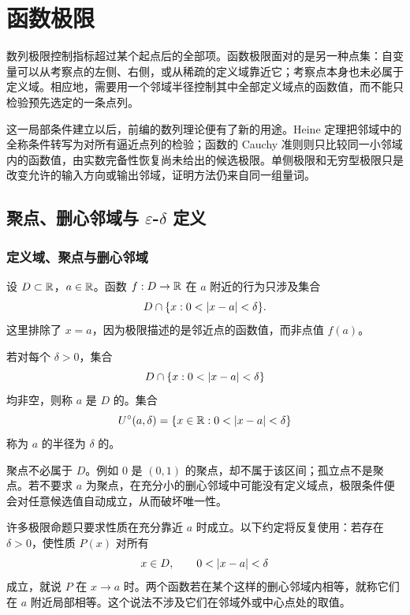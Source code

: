 \chapter{函数极限}
\label{chap:function-limits}
\label{chap:function-limit-definition}
\label{chap:heine-cauchy}
\label{chap:generalized-function-limits}

数列极限控制指标超过某个起点后的全部项。函数极限面对的是另一种点集：自变量可以从考察点的左侧、右侧，或从稀疏的定义域靠近它；考察点本身也未必属于定义域。相应地，需要用一个邻域半径控制其中全部定义域点的函数值，而不能只检验预先选定的一条点列。

这一局部条件建立以后，前编的数列理论便有了新的用途。Heine 定理把邻域中的全称条件转写为对所有逼近点列的检验；函数的 Cauchy 准则则只比较同一小邻域内的函数值，由实数完备性恢复尚未给出的候选极限。单侧极限和无穷型极限只是改变允许的输入方向或输出邻域，证明方法仍来自同一组量词。

\section{聚点、删心邻域与 \texorpdfstring{\(\varepsilon\)-\(\delta\)}{epsilon-delta} 定义}

\subsection{定义域、聚点与删心邻域}

设 \(D\subset\mathbb{R}\)，\(a\in\mathbb{R}\)。函数 \(f:D\to\mathbb{R}\) 在 \(a\) 附近的行为只涉及集合
\[
 D\cap\{x:0<\left|x-a\right|<\delta\}.
\]
这里排除了 \(x=a\)，因为极限描述的是邻近点的函数值，而非点值 \(f(a)\)。

\begin{definition}[聚点]
若对每个 \(\delta>0\)，集合
\[
 D\cap\{x:0<\left|x-a\right|<\delta\}
\]
均非空，则称 \(a\) 是 \(D\) 的。集合
\[
 U^\circ(a,\delta)=\{x\in\mathbb{R}:0<\left|x-a\right|<\delta\}
\]
称为 \(a\) 的半径为 \(\delta\) 的。
\end{definition}

聚点不必属于 \(D\)。例如 \(0\) 是 \((0,1)\) 的聚点，却不属于该区间；孤立点不是聚点。若不要求 \(a\) 为聚点，在充分小的删心邻域中可能没有定义域点，极限条件便会对任意候选值自动成立，从而破坏唯一性。

许多极限命题只要求性质在充分靠近 \(a\) 时成立。以下约定将反复使用：若存在 \(\delta>0\)，使性质 \(P(x)\) 对所有
\[
 x\in D,\qquad 0<\left|x-a\right|<\delta
\]
成立，就说 \(P\) 在 \(x\to a\) 时。两个函数若在某个这样的删心邻域内相等，就称它们在 \(a\) 附近局部相等。这个说法不涉及它们在邻域外或中心点处的取值。

